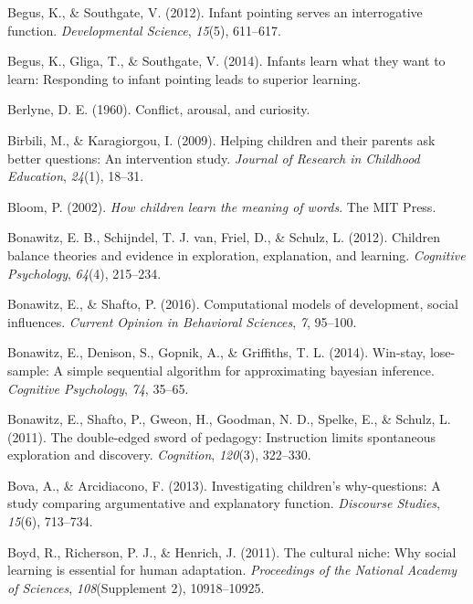 \documentclass[english,floatsintext,man]{apa6}
\theoremstyle{definition}
\theoremstyle{definition}
\theoremstyle{definition}
\theoremstyle{remark}
\begin{document}
\hypertarget{ref-begus2012infant}{}
Begus, K., \& Southgate, V. (2012). Infant pointing serves an
interrogative function. \emph{Developmental Science}, \emph{15}(5),
611--617.

\hypertarget{ref-begus2014infants}{}
Begus, K., Gliga, T., \& Southgate, V. (2014). Infants learn what they
want to learn: Responding to infant pointing leads to superior learning.

\hypertarget{ref-berlyne1960conflict}{}
Berlyne, D. E. (1960). Conflict, arousal, and curiosity.

\hypertarget{ref-birbili2009helping}{}
Birbili, M., \& Karagiorgou, I. (2009). Helping children and their
parents ask better questions: An intervention study. \emph{Journal of
Research in Childhood Education}, \emph{24}(1), 18--31.

\hypertarget{ref-bloom2002children}{}
Bloom, P. (2002). \emph{How children learn the meaning of words}. The
MIT Press.

\hypertarget{ref-bonawitz2012children}{}
Bonawitz, E. B., Schijndel, T. J. van, Friel, D., \& Schulz, L. (2012).
Children balance theories and evidence in exploration, explanation, and
learning. \emph{Cognitive Psychology}, \emph{64}(4), 215--234.

\hypertarget{ref-bonawitz2016computational}{}
Bonawitz, E., \& Shafto, P. (2016). Computational models of development,
social influences. \emph{Current Opinion in Behavioral Sciences},
\emph{7}, 95--100.

\hypertarget{ref-bonawitz2014win}{}
Bonawitz, E., Denison, S., Gopnik, A., \& Griffiths, T. L. (2014).
Win-stay, lose-sample: A simple sequential algorithm for approximating
bayesian inference. \emph{Cognitive Psychology}, \emph{74}, 35--65.

\hypertarget{ref-bonawitz2011double}{}
Bonawitz, E., Shafto, P., Gweon, H., Goodman, N. D., Spelke, E., \&
Schulz, L. (2011). The double-edged sword of pedagogy: Instruction
limits spontaneous exploration and discovery. \emph{Cognition},
\emph{120}(3), 322--330.

\hypertarget{ref-bova2013investigating}{}
Bova, A., \& Arcidiacono, F. (2013). Investigating children's
why-questions: A study comparing argumentative and explanatory function.
\emph{Discourse Studies}, \emph{15}(6), 713--734.

\hypertarget{ref-boyd2011cultural}{}
Boyd, R., Richerson, P. J., \& Henrich, J. (2011). The cultural niche:
Why social learning is essential for human adaptation. \emph{Proceedings
of the National Academy of Sciences}, \emph{108}(Supplement 2),
10918--10925.
\end{document}
